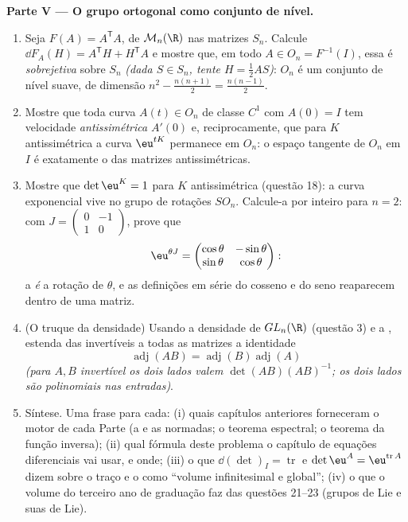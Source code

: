 \begin{problem}
\medskip
\noindent\textbf{Parte V --- O grupo ortogonal como conjunto de
nível.}
\begin{enumerate}[resume]
  \item Seja $F(A) = A^{\mathsf T}A$, de $\mathcal M_n(\R)$ nas
        matrizes  $S_n$. Calcule $\dd F_A(H) =
        A^{\mathsf T}H + H^{\mathsf T}A$ e mostre que, em todo
        $A \in O_n = F^{-1}(I)$, essa  é
        \emph{sobrejetiva} sobre $S_n$ \emph{(dada $S \in S_n$,
        tente $H = \frac12 AS$)}: $O_n$ é um conjunto de nível suave,
        de dimensão $n^2 - \frac{n(n+1)}2 = \frac{n(n-1)}2$.
  \item Mostre que toda curva $A(t) \in O_n$ de classe $C^1$ com $A(0) =
        I$ tem velocidade \emph{antissimétrica} $A'(0)$ e,
        reciprocamente, que para $K$ antissimétrica a curva
        $\eu^{tK}$ permanece em $O_n$: o espaço tangente de $O_n$
        em $I$ é exatamente o das matrizes antissimétricas.
  \item Mostre que $\det\eu^{K} = 1$ para $K$ antissimétrica (questão
        18): a curva exponencial vive no grupo de rotações
        $SO_n$. Calcule-a por inteiro para $n = 2$: com $J =
        \begin{pmatrix}0 & -1\\ 1 & 0\end{pmatrix}$, prove que
        \[
        \eu^{\theta J} = \begin{pmatrix} \cos\theta &
        -\sin\theta\\ \sin\theta & \cos\theta\end{pmatrix} :
        \]
        a  \emph{é} a rotação de
        $\theta$, e as definições em série do cosseno e do seno
        reaparecem dentro de uma matriz.
  \item (O truque da densidade) Usando a densidade de $GL_n(\R)$
        (questão 3) e a , estenda das invertíveis a
        todas as matrizes a identidade
        \[
        \operatorname{adj}(AB) =
        \operatorname{adj}(B)\operatorname{adj}(A)
        \]
        \emph{(para $A, B$ invertível os dois lados valem
        $\det(AB)(AB)^{-1}$; os dois lados são polinomiais nas
        entradas)}.
  \item Síntese. Uma frase para cada: (i) quais capítulos anteriores
        forneceram o motor de cada Parte
        (a  e as  normadas; o teorema
        espectral; o teorema da função inversa); (ii) qual
        fórmula deste problema o capítulo de equações
        diferenciais vai usar, e onde; (iii) o que
        $\dd(\det)_I = \operatorname{tr}$ e $\det\eu^A =
        \eu^{\operatorname{tr}A}$ dizem sobre o traço e o
         como ``volume infinitesimal e global'';
        (iv) o que o volume do terceiro ano de graduação faz das questões
        21--23 (grupos de Lie e suas  de Lie).
\end{enumerate}
\end{problem}
